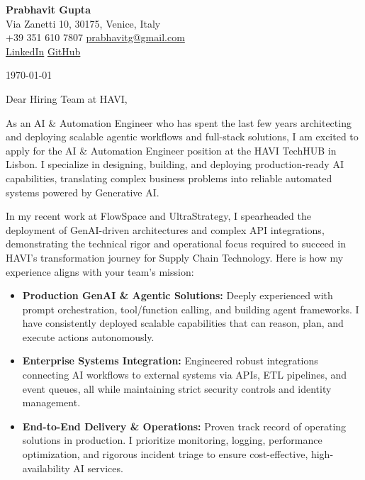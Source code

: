 \documentclass[11pt,a4paper]{article}
\begin{document}
\begin{center}
    {\huge \textbf{Prabhavit Gupta}} \\
    \vspace{4pt}
    Via Zanetti 10, 30175, Venice, Italy \\
    +39 351 610 7807 \textbar{} \href{mailto:prabhavitg@gmail.com}{prabhavitg@gmail.com} \\
    \href{https://www.linkedin.com/in/prabhavit/}{LinkedIn} \textbar{} \href{https://github.com/prab-gupta}{GitHub}
\end{center}

\vspace{20pt}

\noindent \today

\vspace{10pt}

\noindent Dear Hiring Team at HAVI,

\vspace{10pt}

\noindent As an AI \& Automation Engineer who has spent the last few years architecting and deploying scalable agentic workflows and full-stack solutions, I am excited to apply for the AI \& Automation Engineer position at the HAVI TechHUB in Lisbon. I specialize in designing, building, and deploying production-ready AI capabilities, translating complex business problems into reliable automated systems powered by Generative AI.

\noindent In my recent work at FlowSpace and UltraStrategy, I spearheaded the deployment of GenAI-driven architectures and complex API integrations, demonstrating the technical rigor and operational focus required to succeed in HAVI's transformation journey for Supply Chain Technology. Here is how my experience aligns with your team's mission:

\begin{itemize}[leftmargin=*]
    \item \textbf{Production GenAI \& Agentic Solutions:} Deeply experienced with prompt orchestration, tool/function calling, and building agent frameworks. I have consistently deployed scalable capabilities that can reason, plan, and execute actions autonomously.
    \item \textbf{Enterprise Systems Integration:} Engineered robust integrations connecting AI workflows to external systems via APIs, ETL pipelines, and event queues, all while maintaining strict security controls and identity management.
    \item \textbf{End-to-End Delivery \& Operations:} Proven track record of operating solutions in production. I prioritize monitoring, logging, performance optimization, and rigorous incident triage to ensure cost-effective, high-availability AI services.
\end{itemize}
\end{document}
